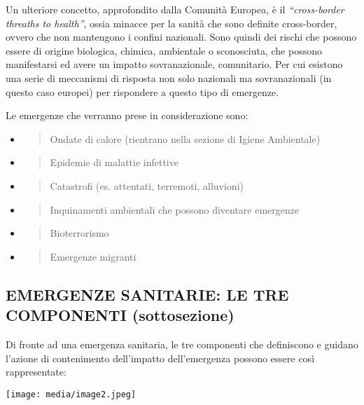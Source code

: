 \documentclass[]{article}
\begin{document}
Un ulteriore concetto, approfondito dalla Comunità Europea, è il
\emph{``cross-border threaths to health''}, ossia minacce per la sanità
che sono definite cross-border, ovvero che non mantengono i confini
nazionali. Sono quindi dei rischi che possono essere di origine
biologica, chimica, ambientale o sconosciuta, che possono manifestarsi
ed avere un impatto sovranazionale, comunitario. Per cui esistono una
serie di meccanismi di risposta non solo nazionali ma sovranazionali (in
questo caso europei) per rispondere a questo tipo di emergenze.

Le emergenze che verranno prese in considerazione sono:

\begin{itemize}
\item
  \begin{quote}
  Ondate di calore (rientrano nella sezione di Igiene Ambientale)
  \end{quote}
\item
  \begin{quote}
  Epidemie di malattie infettive
  \end{quote}
\item
  \begin{quote}
  Catastrofi (es. attentati, terremoti, alluvioni)
  \end{quote}
\item
  \begin{quote}
  Inquinamenti ambientali che possono diventare emergenze
  \end{quote}
\item
  \begin{quote}
  Bioterrorismo
  \end{quote}
\item
  \begin{quote}
  Emergenze migranti
  \end{quote}
\end{itemize}

\subsection{EMERGENZE SANITARIE: LE TRE COMPONENTI
(sottosezione)}\label{emergenze-sanitarie-le-tre-componenti-sottosezione}

Di fronte ad una emergenza sanitaria, le tre componenti che definiscono
e guidano l'azione di contenimento dell'impatto dell'emergenza possono
essere così rappresentate:

\texttt{[image: media/image2.jpeg]}
\end{document}
